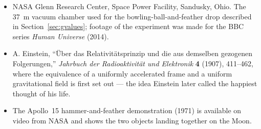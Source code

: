 \documentclass[11pt,twoside,openany]{book}
\begin{document}
\begin{itemize}[itemsep=3pt]
  \item NASA Glenn Research Center, Space Power Facility, Sandusky, Ohio. The \SI{37}{\metre} vacuum chamber used for the bowling-ball-and-feather drop described in Section~\ref{sec:gvalues}; footage of the experiment was made for the BBC series \emph{Human Universe} (2014).
  \item A. Einstein, ``\"Uber das Relativit\"atsprinzip und die aus demselben gezogenen Folgerungen,'' \emph{Jahrbuch der Radioaktivit\"at und Elektronik} \textbf{4} (1907), 411--462, where the equivalence of a uniformly accelerated frame and a uniform gravitational field is first set out --- the idea Einstein later called the happiest thought of his life.
  \item The Apollo~15 hammer-and-feather demonstration (1971) is available on video from NASA and shows the two objects landing together on the Moon.
\end{itemize}
\end{document}
